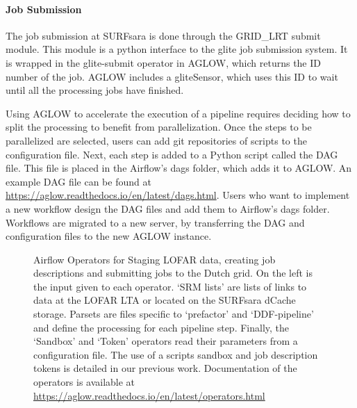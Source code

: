 \paragraph{Job Submission}
The job submission at SURFsara is done through the GRID\_LRT submit module. This module is a python interface to the glite job submission system. It is wrapped in the glite-submit operator in AGLOW, which returns the ID number of the job. AGLOW includes a gliteSensor, which uses this ID to wait until all the processing jobs have finished. 


Using AGLOW to accelerate the execution of a pipeline requires deciding how to split the processing to benefit from parallelization. Once the steps to be parallelized are selected, users can add git repositories of scripts to the configuration file. Next, each step is added to a Python script called the DAG file. This file is placed in the Airflow's dags folder, which adds it to AGLOW. An example DAG file can be found at \url{https://aglow.readthedocs.io/en/latest/dags.html}. Users who want to implement a new workflow design the DAG files and add them to Airflow's dags folder. Workflows are migrated to a new server, by transferring the DAG and configuration files to the new AGLOW instance. 


\begin{figure}[thpb]
 \centering
 \caption{Airflow Operators for Staging LOFAR data, creating job descriptions and submitting jobs to the Dutch grid. On the left is the input given to each operator. `SRM lists' are lists of links to data at the LOFAR LTA or located on the SURFsara dCache storage. Parsets are files specific to `prefactor' and `DDF-pipeline' and define the processing for each pipeline step. Finally, the `Sandbox' and `Token' operators read their parameters from a configuration file. The use of a scripts sandbox and job description tokens is detailed in our previous work\cite{mechev}. Documentation of the operators is available at  \protect\url{https://aglow.readthedocs.io/en/latest/operators.html}}
 \label{AGLOW_Operators}
\end{figure}
 

